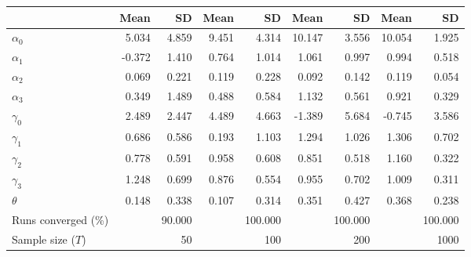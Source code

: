 
\begin{tabular}[t]{lrrrrrrrr}
\toprule
  & Mean & SD & Mean  & SD  & Mean   & SD   & Mean    & SD   \\
\midrule
$\alpha_{0}$ & 5.034 & 4.859 & 9.451 & 4.314 & 10.147 & 3.556 & 10.054 & 1.925\\
$\alpha_{1}$ & -0.372 & 1.410 & 0.764 & 1.014 & 1.061 & 0.997 & 0.994 & 0.518\\
$\alpha_{2}$ & 0.069 & 0.221 & 0.119 & 0.228 & 0.092 & 0.142 & 0.119 & 0.054\\
$\alpha_{3}$ & 0.349 & 1.489 & 0.488 & 0.584 & 1.132 & 0.561 & 0.921 & 0.329\\
$\gamma_{0}$ & 2.489 & 2.447 & 4.489 & 4.663 & -1.389 & 5.684 & -0.745 & 3.586\\
$\gamma_{1}$ & 0.686 & 0.586 & 0.193 & 1.103 & 1.294 & 1.026 & 1.306 & 0.702\\
$\gamma_{2}$ & 0.778 & 0.591 & 0.958 & 0.608 & 0.851 & 0.518 & 1.160 & 0.322\\
$\gamma_{3}$ & 1.248 & 0.699 & 0.876 & 0.554 & 0.955 & 0.702 & 1.009 & 0.311\\
$\theta$ & 0.148 & 0.338 & 0.107 & 0.314 & 0.351 & 0.427 & 0.368 & 0.238\\
Runs converged (\%) &  & 90.000 &  & 100.000 &  & 100.000 &  & 100.000\\
Sample size ($T$) &  & 50 &  & 100 &  & 200 &  & 1000\\
\bottomrule
\end{tabular}
